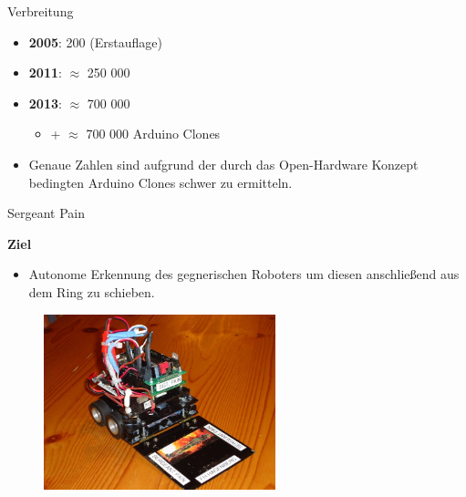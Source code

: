 \documentclass{beamer}
\begin{document}
\begin{frame}{Verbreitung}
\begin{itemize}
	\item \textbf{2005}: 200 (Erstauflage)\cite{IEEE:2016:TheMakingOfArduino}
\end{itemize}
\begin{itemize}
	\item \textbf{2011}: $\approx$ 250 000\cite{IEEE:2016:TheMakingOfArduino}
\end{itemize}
\begin{itemize}
	\item \textbf{2013}: $\approx$ 700 000\cite{Quora:ArduinoSalesNumbers}
	\begin{itemize}
		\item + $\approx$ 700 000 Arduino Clones
	\end{itemize}
\end{itemize}
\vspace{10px}
\begin{itemize}
	\item Genaue Zahlen sind aufgrund der durch das Open-Hardware Konzept bedingten Arduino Clones schwer zu ermitteln.
\end{itemize}
\end{frame}
\begin{frame}{Sergeant Pain}
 \begin{large}\textbf{Ziel}\end{large}
 \begin{itemize}
 	\item Autonome Erkennung des gegnerischen Roboters um diesen anschlie\ss{}end aus dem Ring zu schieben. \href{./videos/sergeant-pain.mp4}{}
 \end{itemize}
 \begin{figure}[H]
  \centering
  \includegraphics[width=0.6\textwidth]{./images/robot-sergeant-pain.jpg}
 \end{figure}
\end{frame}
\end{document}
